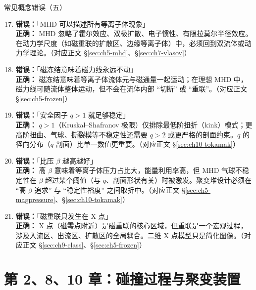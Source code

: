 \documentclass[12pt,a4paper,openany,oneside]{book}
\begin{document}
\begin{warning}{常见概念错误（五）}{}
\begin{enumerate}
\setcounter{enumi}{16}
\item \textbf{错误：}「MHD 可以描述所有等离子体现象」\\
\textbf{正确：} MHD 忽略了霍尔效应、双极扩散、电子惯性、有限拉莫尔半径效应。在动力学尺度（如磁重联的扩散区、边缘等离子体）中，必须回到双流体或动力学理论。（对应正文 \S\ref{sec:ch5-mhd}、\S\ref{sec:ch7-vlasov}）

\item \textbf{错误：}「磁冻结意味着磁力线永远不动」\\
\textbf{正确：} 磁冻结意味着等离子体流体元与磁通量一起运动；在理想 MHD 中，磁力线可随流体整体运动，但不会在流体内部 ``切断'' 或 ``重联''。（对应正文 \S\ref{sec:ch5-frozen}）

\item \textbf{错误：}「安全因子 $q>1$ 就足够稳定」\\
\textbf{正确：} $q>1$（Kruskal--Shafranov 极限）仅排除最低阶扭折（kink）模式；更高阶扭曲、气球、撕裂模等不稳定性还需要 $q>2$ 或更严格的剖面约束。$q$ 的径向分布（$q$ 剖面）比单一数值更重要。（对应正文 \S\ref{sec:ch10-tokamak}）

\item \textbf{错误：}「比压 $\beta$ 越高越好」\\
\textbf{正确：} 高 $\beta$ 意味着等离子体压力占比大，能量利用率高，但 MHD 气球不稳定性在 $\beta$ 超过某个阈值（与 $q$、剖面形状有关）时被激发。聚变堆设计必须在 ``高 $\beta$ 追求'' 与 ``稳定性裕度'' 之间取折中。（对应正文 \S\ref{sec:ch5-magpressure}、\S\ref{sec:ch10-tokamak}）

\item \textbf{错误：}「磁重联只发生在 X 点」\\
\textbf{正确：} X 点（磁零点附近）是磁重联的核心区域，但重联是一个宏观过程，涉及入流区、出流区、扩散区的全局耦合。二维 X 点模型只是简化图像。（对应正文 \S\ref{sec:ch9-class}、\S\ref{sec:ch5-frozen}）
\end{enumerate}
\end{warning}


\section{第 2、8、10 章：碰撞过程与聚变装置}
\end{document}
